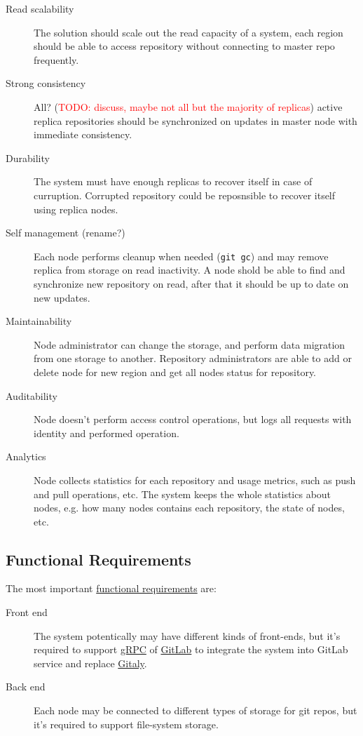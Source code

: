 \documentclass[12pt,oneside]{article}
\newcommand{\code}[1]{\texttt{#1}}
\newcommand{\todo}[1]{\textcolor{red}{TODO: #1}}
\begin{document}
\begin{description}
  \item[Read scalability]
    The solution should scale out the read capacity of a system, each region should be able
    to access repository without connecting to master repo frequently.
  \item[Strong consistency]
    All? (\todo{discuss, maybe not all but the majority of replicas})
    active replica repositories should be synchronized on updates in master node
    with immediate consistency.
  \item[Durability]
    The system must have enough replicas to recover itself in case of curruption.
    Corrupted repository could be reposnsible to recover itself using replica nodes.
  \item[Self management (rename?)]
    Each node performs cleanup when needed (\code{git gc}) and may remove replica
    from storage on read inactivity.
    A node shold be able to find and synchronize new repository on read,
    after that it should be up to date on new updates.
  \item[Maintainability]
    Node administrator can change the storage, and perform data migration from one storage
    to another.
    Repository administrators are able to add or delete node for new region and
    get all nodes status for repository.
  \item[Auditability]
    Node doesn't perform access control operations, but logs all
    requests with identity and performed operation.
  \item[Analytics]
    Node collects statistics for each repository and usage metrics, such as
    push and pull operations, etc. The system keeps the whole statistics about
    nodes, e.g. how many nodes contains each repository, the state of nodes, etc.
\end{description}

\subsection{Functional Requirements}
\label{sec:nfr}

The most important \href{https://en.wikipedia.org/wiki/Functional_requirement}{functional requirements} are:

\begin{description}
  \item[Front end]
    The system potentically may have different kinds of front-ends,
    but it's required to support \href{https://grpc.io/}{gRPC}
    of \href{https://about.gitlab.com/}{GitLab} to integrate the system
    into GitLab service and replace
    \href{https://docs.gitlab.com/ee/administration/gitaly/}{Gitaly}.
  \item[Back end]
    Each node may be connected to different types of storage for git repos,
    but it's required to support file-system storage.
\end{description}
\end{document}

